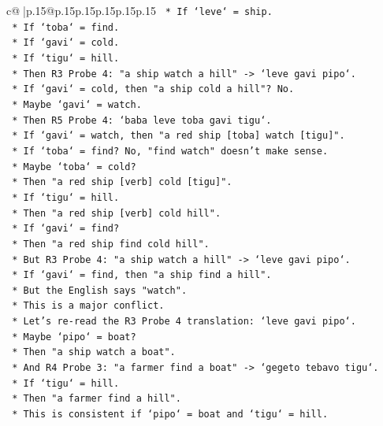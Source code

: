 \documentclass{article}
\begin{document}
{\begin{supertabular}{c@{$\;$}|p{.15\linewidth}@{}p{.15\linewidth}p{.15\linewidth}p{.15\linewidth}p{.15\linewidth}p{.15\linewidth}}
{{{\texttt{        *   If `leve` = ship.} \\
\texttt{        *   If `toba` = find.} \\
\texttt{        *   If `gavi` = cold.} \\
\texttt{        *   If `tigu` = hill.} \\
\texttt{        *   Then R3 Probe 4: "a ship watch a hill" {-}> `leve gavi pipo`.} \\
\texttt{        *   If `gavi` = cold, then "a ship cold a hill"? No.} \\
\texttt{        *   Maybe `gavi` = watch.} \\
\texttt{        *   Then R5 Probe 4: `baba leve toba gavi tigu`.} \\
\texttt{        *   If `gavi` = watch, then "a red ship {[}toba{]} watch {[}tigu{]}".} \\
\texttt{        *   If `toba` = find? No, "find watch" doesn't make sense.} \\
\texttt{        *   Maybe `toba` = cold?} \\
\texttt{        *   Then "a red ship {[}verb{]} cold {[}tigu{]}".} \\
\texttt{        *   If `tigu` = hill.} \\
\texttt{        *   Then "a red ship {[}verb{]} cold hill".} \\
\texttt{        *   If `gavi` = find?} \\
\texttt{        *   Then "a red ship find cold hill".} \\
\texttt{        *   But R3 Probe 4: "a ship watch a hill" {-}> `leve gavi pipo`.} \\
\texttt{        *   If `gavi` = find, then "a ship find a hill".} \\
\texttt{        *   But the English says "watch".} \\
\texttt{        *   This is a major conflict.} \\
\texttt{        *   Let's re{-}read the R3 Probe 4 translation: `leve gavi pipo`.} \\
\texttt{        *   Maybe `pipo` = boat?} \\
\texttt{        *   Then "a ship watch a boat".} \\
\texttt{        *   And R4 Probe 3: "a farmer find a boat" {-}> `gegeto tebavo tigu`.} \\
\texttt{        *   If `tigu` = hill.} \\
\texttt{        *   Then "a farmer find a hill".} \\
\texttt{        *   This is consistent if `pipo` = boat and `tigu` = hill.} \\
}}}
\end{supertabular}}
\end{document}
